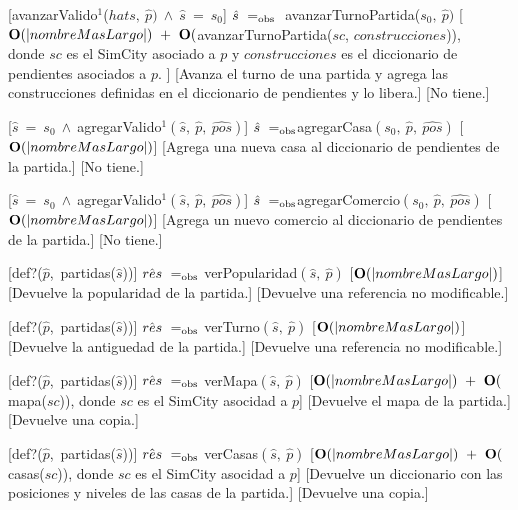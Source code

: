 \begin{Interfaz}
    [avanzarValido$^{1}$($hat{s},\ \hat{p})\ \land\ \hat{s}\ =\ s_0$]
    {$\hat{s}\ =_{\mathrm{obs}}\ $ avanzarTurnoPartida($s_0,\ \hat{p})$}
    [$\bold{O}(|nombreMasLargo|)\ +\ \bold{O}($avanzarTurnoPartida($sc$, $construcciones$)), \\
        \tab donde $sc$ es el SimCity asociado a $p$ y $construcciones$ es el diccionario de pendientes asociados a $p$.
    ]
    [Avanza el turno de una partida y agrega las construcciones definidas en el diccionario de pendientes y lo libera.]
    [No tiene.]

   
    [$\hat{s}\ =\ s_0\ \wedge\ $agregarValido$^{1}(\hat{s},\ \hat{p},\ \hat{pos})$]
    {$\hat{s}\ \igobs $agregarCasa$(s_0,\ \hat{p},\ \hat{pos})$}
    [$\bold{O}(|nombreMasLargo|)$]
    [Agrega una nueva casa al diccionario de pendientes de la partida.]
    [No tiene.]
 
    [$\hat{s}\ =\ s_0\ \wedge\ $agregarValido$^{1}(\hat{s},\ \hat{p},\ \hat{pos})$]
    {$\hat{s}\ \igobs $agregarComercio$(s_0,\ \hat{p},\ \hat{pos})$}
    [$\bold{O}(|nombreMasLargo|)$]
    [Agrega un nuevo comercio al diccionario de pendientes de la partida.]
    [No tiene.]
    
    [def?($\hat{p}$,\ partidas($\hat{s}$))]
    {$\hat{res}\ \igobs\ $verPopularidad$(\hat{s},\ \hat{p})$}
    [$\bold{O}(|nombreMasLargo|)$]
    [Devuelve la popularidad de la partida.]
    [Devuelve una referencia no modificable.]

    [def?($\hat{p}$,\ partidas($\hat{s}$))]
    {$\hat{res}\ \igobs\ $verTurno$(\hat{s},\ \hat{p})$}
    [$\bold{O}(|nombreMasLargo|)$]
    [Devuelve la antiguedad de la partida.]
    [Devuelve una referencia no modificable.]

    [def?($\hat{p}$,\ partidas($\hat{s}$))]
    {$\hat{res}\ \igobs\ $verMapa$(\hat{s},\ \hat{p})$}
    [$\bold{O}(|nombreMasLargo|)\ +\ \bold{O}($mapa($sc$)), donde $sc$ es el SimCity asocidad a $p$]
    [Devuelve el mapa de la partida.]
    [Devuelve una copia.]

    [def?($\hat{p}$,\ partidas($\hat{s}$))]
    {$\hat{res}\ \igobs\ $verCasas$(\hat{s},\ \hat{p})$}
    [$\bold{O}(|nombreMasLargo|)\ +\ \bold{O}($casas($sc$)), donde $sc$ es el SimCity asocidad a $p$]
    [Devuelve un diccionario con las posiciones y niveles de las casas de la partida.]
    [Devuelve una copia.]


\end{Interfaz}
